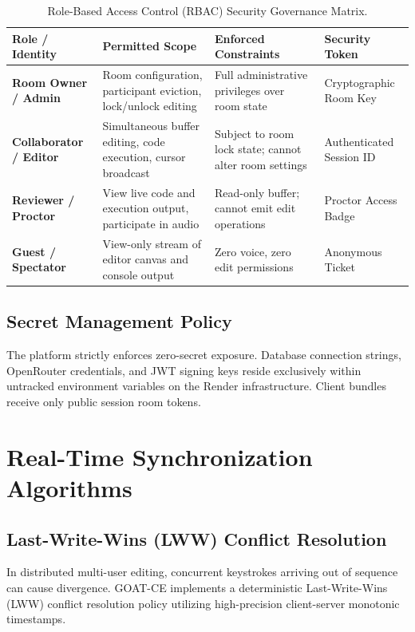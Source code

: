 \documentclass[12pt,a4paper]{report}
\begin{document}
\begin{table}[htbp]
\centering
\small
\begin{tabularx}{\textwidth}{>{\raggedright\arraybackslash\bfseries}p{3.0cm}>{\raggedright\arraybackslash}X>{\raggedright\arraybackslash}X>{\raggedright\arraybackslash}p{2.6cm}}
\toprule
Role / Identity & Permitted Scope & Enforced Constraints & Security Token \\
\midrule
Room Owner / Admin & Room configuration, participant eviction, lock/unlock editing & Full administrative privileges over room state & Cryptographic Room Key \\
\addlinespace
Collaborator / Editor & Simultaneous buffer editing, code execution, cursor broadcast & Subject to room lock state; cannot alter room settings & Authenticated Session ID \\
\addlinespace
Reviewer / Proctor & View live code and execution output, participate in audio & Read-only buffer; cannot emit edit operations & Proctor Access Badge \\
\addlinespace
Guest / Spectator & View-only stream of editor canvas and console output & Zero voice, zero edit permissions & Anonymous Ticket \\
\bottomrule
\end{tabularx}
\caption{Role-Based Access Control (RBAC) Security Governance Matrix.}
\label{tab:rbac}
\end{table}

\section{Secret Management Policy}
The platform strictly enforces zero-secret exposure. Database connection strings, OpenRouter credentials, and JWT signing keys reside exclusively within untracked environment variables on the Render infrastructure. Client bundles receive only public session room tokens.

\chapter{Real-Time Synchronization Algorithms}

\section{Last-Write-Wins (LWW) Conflict Resolution}
In distributed multi-user editing, concurrent keystrokes arriving out of sequence can cause divergence. GOAT-CE implements a deterministic Last-Write-Wins (LWW) conflict resolution policy utilizing high-precision client-server monotonic timestamps.
\end{document}
